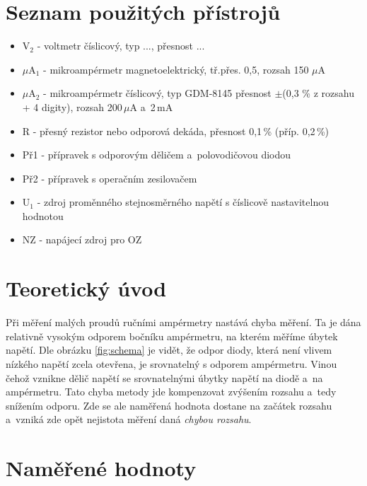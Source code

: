 \documentclass[a4paper,12pt]{article}   %
\newcommand{\tsub}[1]{$_\textrm{#1}$}
\newcommand{\tmu}{$\mu$}
\newcommand{\tpm}{$\pm$}
\begin{document}
\section{Seznam použitých přístrojů}

\begin{itemize}
    \item V\tsub{2} - voltmetr číslicový, typ ..., přesnost ...
    \item $\mu$A\tsub{1} - mikroampérmetr magnetoelektrický, tř.přes. 0,5, rozsah 150 \tmu A
    \item $\mu$A\tsub{2} - mikroampérmetr číslicový, typ GDM-8145 přesnost \tpm (0,3 \% z rozsahu + 4 digity), rozsah 200\,\tmu A a~2\,mA
    \item R - přesný rezistor nebo odporová dekáda, přesnost 0,1\,\% (příp. 0,2\,\%)
    \item Př1 - přípravek s odporovým děličem a~polovodičovou diodou
    \item Př2 - přípravek s operačním zesilovačem
    \item U\tsub{1} - zdroj proměnného stejnosměrného napětí s číslicově nastavitelnou hodnotou 
    \item NZ - napájecí zdroj pro OZ
\end{itemize}



\section{Teoretický úvod}

Při měření malých proudů ručními ampérmetry nastává chyba měření. Ta je dána relativně vysokým odporem bočníku ampérmetru, na kterém měříme úbytek napětí. Dle obrázku \ref{fig:schema} je vidět, že odpor diody, která není vlivem nízkého napětí zcela otevřena, je srovnatelný s odporem ampérmetru. Vinou čehož vznikne dělič napětí se srovnatelnými úbytky napětí na diodě a~na ampérmetru. Tato chyba metody jde kompenzovat zvýšením rozsahu a~tedy snížením odporu. Zde se ale naměřená hodnota dostane na začátek rozsahu a~vzniká zde opět nejistota měření daná \textit{chybou rozsahu}. 



\section{Naměřené hodnoty}
\end{document}
